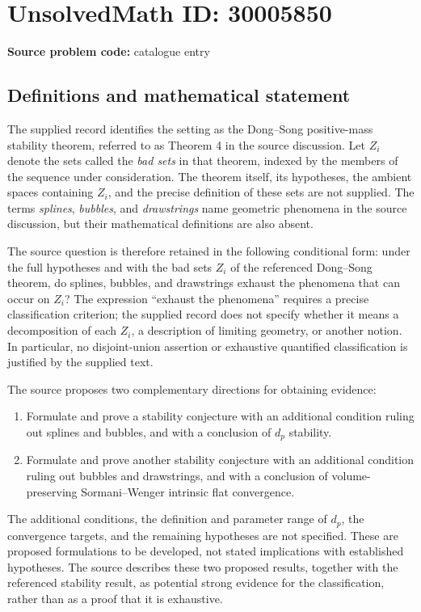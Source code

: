 \documentclass[11pt]{article}
\begin{document}
\section*{UnsolvedMath ID: 30005850}
\textbf{Source problem code:} catalogue entry
\subsection{Definitions and mathematical statement}
The supplied record identifies the setting as the Dong--Song positive-mass stability theorem, referred to as Theorem 4 in the source discussion. Let \(Z_i\) denote the sets called the \emph{bad sets} in that theorem, indexed by the members of the sequence under consideration. The theorem itself, its hypotheses, the ambient spaces containing \(Z_i\), and the precise definition of these sets are not supplied. The terms \emph{splines}, \emph{bubbles}, and \emph{drawstrings} name geometric phenomena in the source discussion, but their mathematical definitions are also absent.

The source question is therefore retained in the following conditional form: under the full hypotheses and with the bad sets \(Z_i\) of the referenced Dong--Song theorem, do splines, bubbles, and drawstrings exhaust the phenomena that can occur on \(Z_i\)? The expression ``exhaust the phenomena'' requires a precise classification criterion; the supplied record does not specify whether it means a decomposition of each \(Z_i\), a description of limiting geometry, or another notion. In particular, no disjoint-union assertion or exhaustive quantified classification is justified by the supplied text.

The source proposes two complementary directions for obtaining evidence:
\begin{enumerate}
\item Formulate and prove a stability conjecture with an additional condition ruling out splines and bubbles, and with a conclusion of \(d_p\) stability.
\item Formulate and prove another stability conjecture with an additional condition ruling out bubbles and drawstrings, and with a conclusion of volume-preserving Sormani--Wenger intrinsic flat convergence.
\end{enumerate}
The additional conditions, the definition and parameter range of \(d_p\), the convergence targets, and the remaining hypotheses are not specified. These are proposed formulations to be developed, not stated implications with established hypotheses. The source describes these two proposed results, together with the referenced stability result, as potential strong evidence for the classification, rather than as a proof that it is exhaustive.
\end{document}
